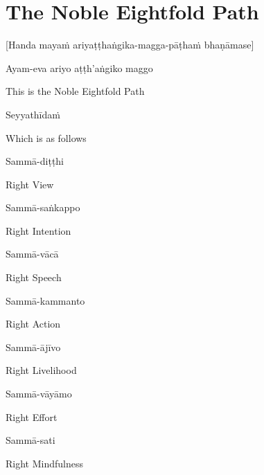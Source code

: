 \suttaRef{[SN 46.22]}

\clearpage

\section{The Noble Eightfold Path}
\label{noble-eightfold-path}

\begin{center}
  [Handa mayaṁ ariyaṭṭhaṅgika-magga-pāṭhaṁ bhaṇāmase]
\end{center}

Ayam-eva ariyo aṭṭh'aṅgiko maggo

\begin{cprenglish}
  This is the Noble Eightfold Path
\end{cprenglish}

Seyyathīdaṁ

\begin{cprenglish}
  Which is as follows
\end{cprenglish}

Sammā-diṭṭhi

\begin{cprenglish}
  Right View
\end{cprenglish}

Sammā-saṅkappo

\begin{cprenglish}
  Right Intention
\end{cprenglish}

Sammā-vācā

\begin{cprenglish}
  Right Speech
\end{cprenglish}

Sammā-kammanto

\begin{cprenglish}
  Right Action
\end{cprenglish}

Sammā-ājīvo

\begin{cprenglish}
  Right Livelihood
\end{cprenglish}

Sammā-vāyāmo

\begin{cprenglish}
  Right Effort
\end{cprenglish}

Sammā-sati

\begin{cprenglish}
  Right Mindfulness
\end{cprenglish}

